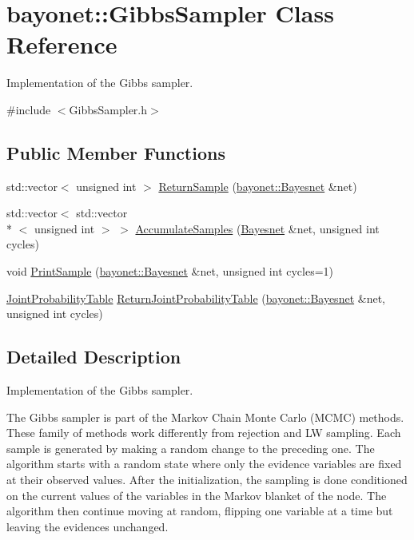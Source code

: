 \hypertarget{classbayonet_1_1_gibbs_sampler}{\section{bayonet\-:\-:Gibbs\-Sampler Class Reference}
\label{classbayonet_1_1_gibbs_sampler}
}


Implementation of the Gibbs sampler.  




{\ttfamily \#include $<$Gibbs\-Sampler.\-h$>$}

\subsection*{Public Member Functions}
\begin{DoxyCompactItemize}
\item 
std\-::vector$<$ unsigned int $>$ \hyperlink{classbayonet_1_1_gibbs_sampler_ac789fc64fd349769633ab84ea5e59f70}{Return\-Sample} (\hyperlink{classbayonet_1_1_bayesnet}{bayonet\-::\-Bayesnet} \&net)
\item 
std\-::vector$<$ std\-::vector\\*
$<$ unsigned int $>$ $>$ \hyperlink{classbayonet_1_1_gibbs_sampler_a625b16c10dc1d4fea3899fd5a0b3c921}{Accumulate\-Samples} (\hyperlink{classbayonet_1_1_bayesnet}{Bayesnet} \&net, unsigned int cycles)
\item 
void \hyperlink{classbayonet_1_1_gibbs_sampler_af375d044a2e0c45a384f37ee4761a2ba}{Print\-Sample} (\hyperlink{classbayonet_1_1_bayesnet}{bayonet\-::\-Bayesnet} \&net, unsigned int cycles=1)
\item 
\hyperlink{classbayonet_1_1_joint_probability_table}{Joint\-Probability\-Table} \hyperlink{classbayonet_1_1_gibbs_sampler_a29dfcfda3462de83fa89672768d690f4}{Return\-Joint\-Probability\-Table} (\hyperlink{classbayonet_1_1_bayesnet}{bayonet\-::\-Bayesnet} \&net, unsigned int cycles)
\end{DoxyCompactItemize}


\subsection{Detailed Description}
Implementation of the Gibbs sampler. 

The Gibbs sampler is part of the Markov Chain Monte Carlo (M\-C\-M\-C) methods. These family of methods work differently from rejection and L\-W sampling. Each sample is generated by making a random change to the preceding one. The algorithm starts with a random state where only the evidence variables are fixed at their observed values. After the initialization, the sampling is done conditioned on the current values of the variables in the Markov blanket of the node. The algorithm then continue moving at random, flipping one variable at a time but leaving the evidences unchanged. 

